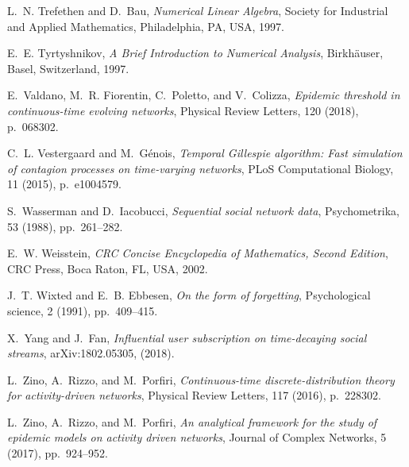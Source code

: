 \documentclass[journal,transmag]{IEEEtran}
\begin{document}
\begin{thebibliography}{10}
{\sc L.~N. Trefethen and D.~Bau}, {\em Numerical Linear Algebra}, Society for
  Industrial and Applied Mathematics, Philadelphia, PA, USA, 1997.

{\sc E.~E. Tyrtyshnikov}, {\em A Brief Introduction to Numerical Analysis},
  Birkh\"{a}user, Basel, Switzerland, 1997.

{\sc E.~Valdano, M.~R. Fiorentin, C.~Poletto, and V.~Colizza}, {\em Epidemic
  threshold in continuous-time evolving networks}, Physical Review Letters, 120
  (2018), p.~068302.

{\sc C.~L. Vestergaard and M.~G\'{e}nois}, {\em Temporal {G}illespie algorithm:
  {F}ast simulation of contagion processes on time-varying networks}, PLoS
  Computational Biology, 11 (2015), p.~e1004579.

{\sc S.~Wasserman and D.~Iacobucci}, {\em Sequential social network data},
  Psychometrika, 53 (1988), pp.~261--282.

{\sc E.~W. Weisstein}, {\em CRC Concise Encyclopedia of Mathematics, Second
  Edition}, CRC Press, Boca Raton, FL, USA, 2002.

{\sc J.~T. Wixted and E.~B. Ebbesen}, {\em On the form of forgetting},
  Psychological science, 2 (1991), pp.~409--415.

{\sc X.~Yang and J.~Fan}, {\em Influential user subscription on time-decaying
  social streams}, arXiv:1802.05305,  (2018).

{\sc L.~Zino, A.~Rizzo, and M.~Porfiri}, {\em Continuous-time
  discrete-distribution theory for activity-driven networks}, Physical Review
  Letters, 117 (2016), p.~228302.

{\sc L.~Zino, A.~Rizzo, and M.~Porfiri}, {\em An analytical framework for the
  study of epidemic models on activity driven networks}, Journal of Complex
  Networks, 5 (2017), pp.~924--952.

\end{thebibliography}



\end{document}
